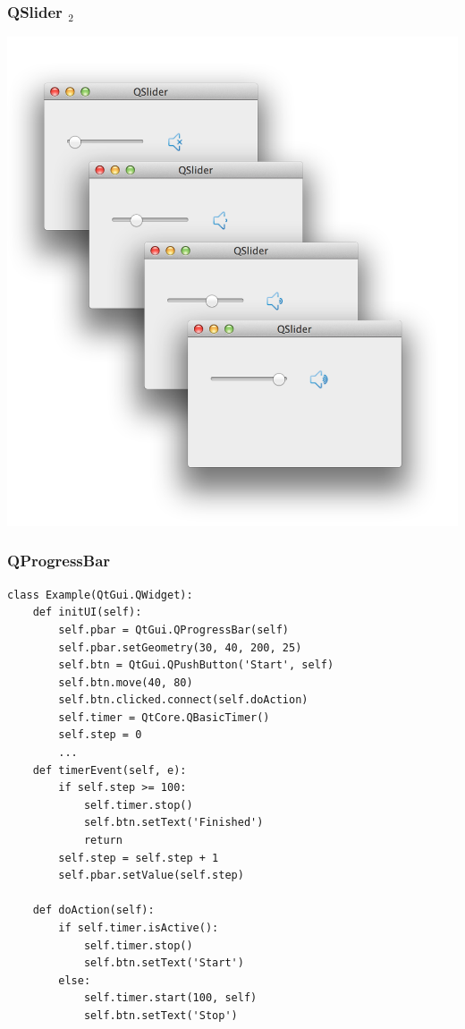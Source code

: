 \documentclass[utf8,compress]{beamer}
\begin{document}
\begin{frame}[fragile]
  \frametitle{QSlider $_2$}
\begin{center}
\includegraphics[scale=0.17]{pyqt14.png}
\end{center}
\end{frame}

\begin{frame}
  \frametitle{QProgressBar}
\begin{verbatim}
class Example(QtGui.QWidget):
    def initUI(self):
        self.pbar = QtGui.QProgressBar(self)
        self.pbar.setGeometry(30, 40, 200, 25)
        self.btn = QtGui.QPushButton('Start', self)
        self.btn.move(40, 80)
        self.btn.clicked.connect(self.doAction)
        self.timer = QtCore.QBasicTimer()
        self.step = 0
        ...
    def timerEvent(self, e):      
        if self.step >= 100:
            self.timer.stop()
            self.btn.setText('Finished')
            return
        self.step = self.step + 1
        self.pbar.setValue(self.step)

    def doAction(self):
        if self.timer.isActive():
            self.timer.stop()
            self.btn.setText('Start')
        else:
            self.timer.start(100, self)
            self.btn.setText('Stop')
\end{verbatim}
\end{frame}
\end{document}
